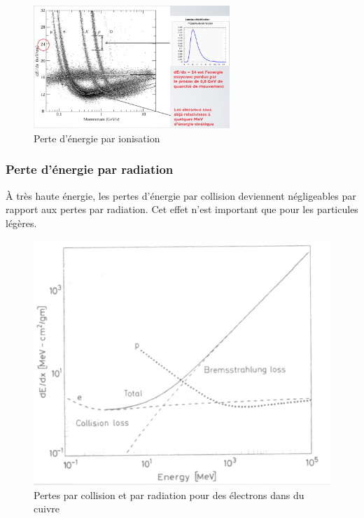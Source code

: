 \begin{figure}[H]
    \centering
    \includegraphics[width=0.66\textwidth]{Images1/perteionisation.PNG}
    \caption{Perte d'énergie par ionisation}
    \label{fig:pertes_ionisation}
\end{figure}

\subsubsection{Perte d'énergie par radiation}
À très haute énergie, les pertes d'énergie par collision deviennent négligeables par rapport aux pertes par radiation. Cet effet n'est important que pour les particules légères.

\begin{figure}[ht]
    \centering
    \includegraphics[scale=0.40]{Images1/bremstrucmachin.png}
    \caption{Pertes par collision et par radiation pour des électrons dans du cuivre}
    \label{fig:pertes_collision}
\end{figure}

